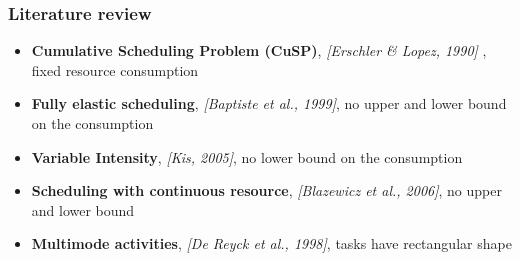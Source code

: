 \begin{frame}
  \frametitle{Literature review}
  \begin{itemize}
    \vfill
  \item {\bf Cumulative Scheduling Problem (CuSP)},
    {\color{gray!50!black!50} \it [Erschler \& Lopez, 1990] }, {\color{blue!80!black!80} fixed resource consumption}
    \vfill
    \pause
  \item {\bf Fully elastic scheduling}, {\color{gray!50!black!50} \it [Baptiste et al., 1999]}, {\color{blue!80!black!80} no upper and lower bound on the consumption}
    \vfill
    \pause
  \item {\bf Variable Intensity}, {\color{gray!50!black!50} \it [Kis, 2005]}, {\color{blue!80!black!80} no lower bound on the consumption}
    \vfill  
    \pause
  \item {\bf Scheduling with continuous resource}, {\color{gray!50!black!50}\it [Blazewicz et al., 2006]}, {\color{blue!80!black!80}  no upper and lower bound}
    \vfill
    \pause
  \item {\bf Multimode activities}, {\color{gray!50!black!50}\it [De Reyck
      et al., 1998]},
    {\color{blue!80!black!80} tasks have rectangular shape}
  \end{itemize}
  \vfill
\end{frame}


